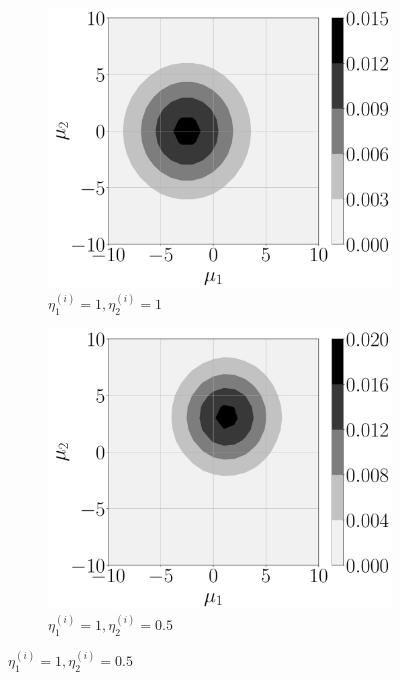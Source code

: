 \documentclass[%
reprint,
superscriptaddress,
 amsmath,amssymb,amsfonts,
 aps,
 pra,
 longbibliography
]{revtex4-2}
\begin{document}
\begin{figure}
    \centering
    \begin{subfigure}[c]{.3\linewidth}
\includegraphics[width=\linewidth]{pics/double-homodyne/1111.pdf}
\caption[]{$\eta_1^{(i)}=1,\eta_2^{(i)}=1$}
        \end{subfigure}
\hfill
        \begin{subfigure}[c]{.3\linewidth}
 \includegraphics[width=\linewidth]{pics/double-homodyne/10.510.5.pdf}
\caption[]{$\eta_1^{(i)}=1,\eta_2^{(i)}=0.5$}
\end{subfigure}
\hfill

\end{figure}
\end{document}
